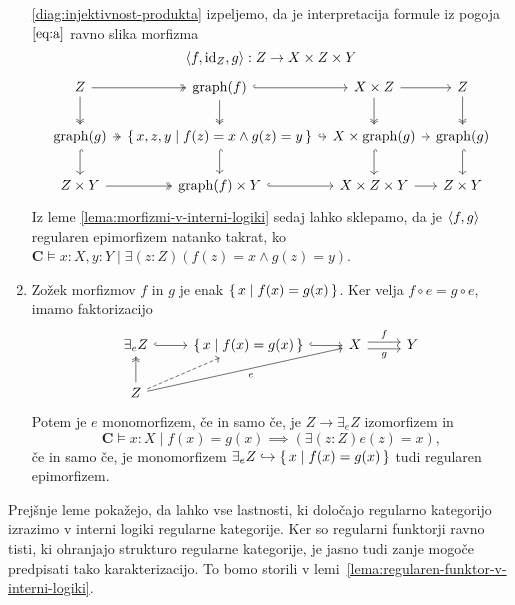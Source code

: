 \documentclass[../kategoricna_logika.tex]{subfiles}
\begin{document}
\begin{dokaz}
\begin{enumerate}[label=(\roman*)]
      \eqref{diag:injektivnost-produkta} izpeljemo, da je
      interpretacija formule iz pogoja $\eqref{eq:a}$ ravno slika morfizma
      \[\langle f, \mathrm{id}_{Z}, g \rangle : Z \to X \times Z \times Y\]
      \begin{equation*}
        \begin{tikzcd}[column sep=tiny]
          Z \ar[d, two heads] \ar[r, two heads] & \mathrm{graph}(f)
          \ar[d, two heads] \ar[r, hook] &
          X \times Z \ar[d, two heads] \ar[r] & Z \ar[d, two heads] \\
          \mathrm{graph}(g) \ar[d, hook] \ar[r, two heads] &
          \set{x,z,y \mid f(z) = x \land g(z) = y} \ar[d, hook] \ar[r,
          hook] & X \times \mathrm{graph}(g) \ar[d, hook] \ar[r] &
          \mathrm{graph}(g) \ar[d, hook] \\
          Z \times Y \ar[r, two heads] & \mathrm{graph}(f) \times Y
          \ar[r, hook] & X \times Z \times Y \ar[r] & Z \times Y
        \end{tikzcd}
      \end{equation*}
      Iz leme \ref{lema:morfizmi-v-interni-logiki} sedaj lahko
      sklepamo, da je $\langle f,g \rangle$ regularen epimorfizem natanko
      takrat, ko
      $\mathbf{C} \models x:X,y:Y \mid \exists (z:Z) (f(z) = x \land g(z) = y)$.
      
    \item Zožek morfizmov $f$ in $g$ je enak
      $\lbrace\,x \mid f(x) = g(x)\,\rbrace$.  Ker velja
      ${f \circ e = g \circ e}$, imamo faktorizacijo
      \begin{equation*}
        \begin{tikzcd}
          \exists_{e}Z \ar[r, hook] & \set{x \mid f(x) = g(x)} \ar[r,
          hook] &
          X \ar[r, shift left, "f"] \ar[r, shift right, "g"'] & Y \\
          Z \ar[u, two heads] \ar[ur, dashed] \ar[urr, "e"']
        \end{tikzcd}
      \end{equation*}
      Potem je $e$ monomorfizem, če in samo če, je
      $Z \to \exists_{e}Z$ izomorfizem in
      \[\mathbf{C} \models x:X \mid f(x) = g(x) \implies (\exists (z:Z) e(z) =
        x),\] če in samo če, je monomorfizem
      $\exists_{e}Z \hookrightarrow \lbrace\,x \mid f(x) = g(x)\,\rbrace$ tudi
      regularen epimorfizem.\qedhere
    \end{enumerate}
  \end{dokaz}%
  Prejšnje leme pokažejo, da lahko vse lastnosti, ki določajo
  regularno kategorijo izrazimo v interni logiki regularne kategorije.
  Ker so regularni funktorji ravno tisti, ki ohranjajo strukturo regularne
  kategorije, je jasno tudi zanje mogoče predpisati tako karakterizacijo.
  To bomo storili v lemi~\ref{lema:regularen-funktor-v-interni-logiki}.
%
\end{document}
